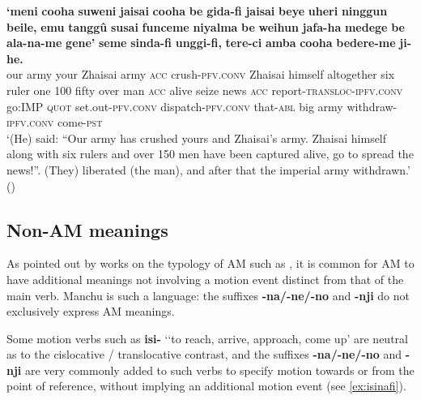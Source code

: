 \documentclass{article}
\newcommand{\ipa}[1]{\textbf{{\phon\mbox{#1}}}} %
\begin{document}
\begin{exe}
\ex \label{ex:alaname.gene}
\gll
\ipa{`meni} 	\ipa{cooha} 	\ipa{suweni} 	\ipa{jaisai} 	\ipa{cooha} 	\ipa{be} 	\ipa{gida-fi} 	\ipa{jaisai} 	\ipa{beye} 	\ipa{uheri} 	\ipa{ninggun} 	\ipa{beile,} 	\ipa{emu} 	\ipa{tanggû} 	\ipa{susai} 	\ipa{funceme} 	\ipa{niyalma} 	\ipa{be} 	\ipa{weihun} 	\ipa{jafa-ha} 	\ipa{medege} 	\ipa{be} 	\ipa{ala-na-me} 	\ipa{gene'} 	\ipa{seme} 	\ipa{sinda-fi} 	\ipa{unggi-fi,} 	\ipa{tere-ci} 	\ipa{amba} 	\ipa{cooha} 	\ipa{bedere-me} 	\ipa{ji-he.} \\
our army your Zhaisai army \textsc{acc} crush-\textsc{pfv.conv} Zhaisai himself altogether six ruler one 100 fifty over man \textsc{acc} alive seize news \textsc{acc} report-\textsc{transloc-ipfv.conv} go:\textsc{IMP} \textsc{quot} set.out-\textsc{pfv.conv} dispatch-\textsc{pfv.conv} that-\textsc{abl} big army withdraw-\textsc{ipfv.conv} come-\textsc{pst} \\
\glt ‘(He) said: “Our army has crushed yours and Zhaisai’s army. Zhaisai himself along with six rulers and over 150 men have been captured alive, go to spread the news!”. (They) liberated (the man), and after that the imperial army withdrawn.’ (\citealt[227, 20-21]{shunjuu92yargiyan})
\end{exe}

\subsection{Non-AM meanings}
As pointed out by works on the typology of AM such as \citet[3]{guillaume16am}, it is common for AM to have additional meanings not involving a motion event distinct from that of the main verb. Manchu is such a language: the suffixes \ipa{-na/-ne/-no} and \ipa{-nji} do not exclusively express AM meanings. 

Some motion verbs such as \ipa{isi-} `‘to reach, arrive, approach, come up' are neutral as to the cislocative / translocative contrast, and the suffixes \ipa{-na/-ne/-no} and \ipa{-nji} are very commonly added to such verbs to specify motion towards or from the point of reference, without implying an additional motion event (see \ref{ex:isinafi}).
\end{document}
